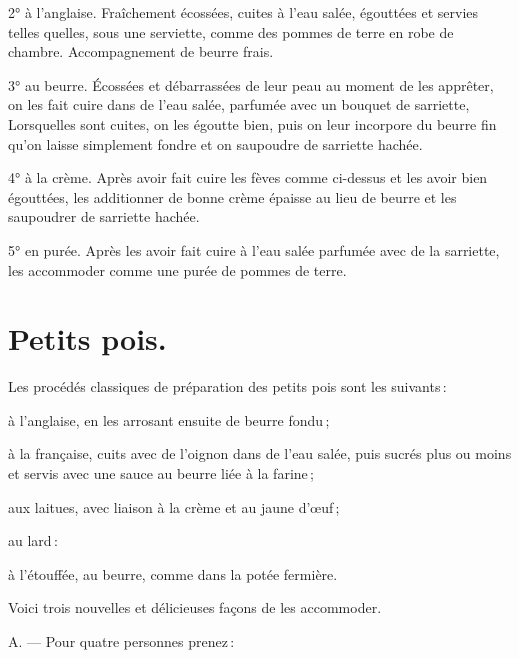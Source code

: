 2° à l'anglaise. Fraîchement écossées, cuites à l'eau salée, égouttées et
servies telles quelles, sous une serviette, comme des pommes de terre en robe
de chambre. Accompagnement de beurre frais.

3° au beurre. Écossées et débarrassées de leur peau au moment de les apprêter,
on les fait cuire dans de l’eau salée, parfumée avec un bouquet de sarriette,
Lorsquelles sont cuites, on les égoutte bien, puis on leur incorpore du beurre
fin qu'on laisse simplement fondre et on saupoudre de sarriette hachée.

4° à la crème. Après avoir fait cuire les fèves comme ci-dessus et les avoir
bien égouttées, les additionner de bonne crème épaisse au lieu de beurre et les
saupoudrer de sarriette hachée.

5° en purée. Après les avoir fait cuire à l’eau salée parfumée avec de la
sarriette, les accommoder comme une purée de pommes de terre.

\section*{\centering Petits pois.}
{}

Les procédés classiques de préparation des petits pois sont les suivants :

à l'anglaise, en les arrosant ensuite de beurre fondu ;

à la française, cuits avec de l'oignon dans de l'eau salée, puis sucrés plus ou
moins et servis avec une sauce au beurre liée à la farine ;

aux laitues, avec liaison à la crème et au jaune d'œuf ;

au lard :

à l'étouffée, au beurre, comme dans la potée fermière.

\medskip

Voici trois nouvelles et délicieuses façons de les accommoder.

\medskip

A. — Pour quatre personnes prenez :

